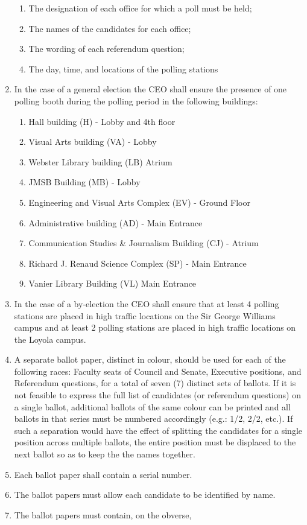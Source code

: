 \documentclass[oneside]{book}
\begin{document}
\begin{enumerate}
\begin{enumerate}
\item The designation of each office for which a poll must be held; 
\item The names of the candidates for each office; 
\item The wording of each referendum question; 
\item The day, time, and locations of the polling stations 
\end{enumerate}
\item In the case of a general election the CEO shall ensure the presence
of one polling booth during the polling period in the following buildings: 

\begin{enumerate}
\item Hall building (H) - Lobby and 4th floor 
\item Visual Arts building (VA) - Lobby 
\item Webster Library building (LB) Atrium 
\item JMSB Building (MB) - Lobby
\item Engineering and Visual Arts Complex (EV) - Ground Floor
\item Administrative building (AD) - Main Entrance 
\item Communication Studies \& Journalism Building (CJ) - Atrium 
\item Richard J. Renaud Science Complex (SP) - Main Entrance 
\item Vanier Library Building (VL) Main Entrance
\end{enumerate}
\item In the case of a by-election the CEO shall ensure that at least 4
polling stations are placed in high traffic locations on the Sir George
Williams campus and at least 2 polling stations are placed in high
traffic locations on the Loyola campus. 
\item A separate ballot paper, distinct in colour, should be used for each of the following
races: Faculty seats of Council and Senate, Executive positions, and Referendum questions, for a
total of seven (7) distinct sets of ballots. If it is not feasible to express the full list of candidates (or
referendum questions) on a single ballot, additional ballots of the same colour can be printed and all
ballots in that series must be numbered accordingly (e.g.: 1/2, 2/2, etc.). If such a separation would
have the effect of splitting the candidates for a single position across multiple ballots, the entire
position must be displaced to the next ballot so as to keep the the names together. 
\item Each ballot paper shall contain a serial number. 
\item The ballot papers must allow each candidate to be identified by name. 
\item The ballot papers must contain, on the obverse, 


\end{enumerate}
\end{document}
